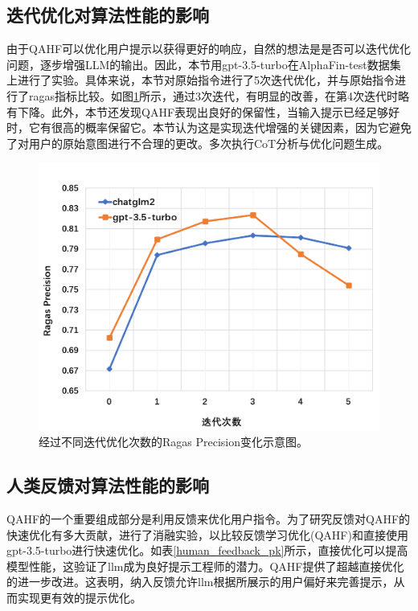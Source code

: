 \subsection{迭代优化对算法性能的影响}

由于QAHF可以优化用户提示以获得更好的响应，自然的想法是是否可以迭代优化问题，逐步增强LLM的输出。因此，本节用gpt-3.5-turbo在AlphaFin-test数据集上进行了实验。具体来说，本节对原始指令进行了5次迭代优化，并与原始指令进行了ragas指标比较。如图\ref{multi_iter_optimize_ragas_exp}所示，通过3次迭代，有明显的改善，在第4次迭代时略有下降。此外，本节还发现QAHF表现出良好的保留性，当输入提示已经足够好时，它有很高的概率保留它。本节认为这是实现迭代增强的关键因素，因为它避免了对用户的原始意图进行不合理的更改。多次执行CoT分析与优化问题生成。

\begin{figure}[htbp]
	\centering
	\includegraphics[scale=0.5]{Fig/multi_iter_optimize_ragas_exp.png}
	\caption{\label{multi_iter_optimize_ragas_exp}经过不同迭代优化次数的Ragas Precision变化示意图。}
\end{figure}

\subsection{人类反馈对算法性能的影响}

QAHF的一个重要组成部分是利用反馈来优化用户指令。为了研究反馈对QAHF的快速优化有多大贡献，进行了消融实验，以比较反馈学习优化(QAHF)和直接使用gpt-3.5-turbo进行快速优化。如表\ref{human_feedback_pk}所示，直接优化可以提高模型性能，这验证了llm成为良好提示工程师的潜力。QAHF提供了超越直接优化的进一步改进。这表明，纳入反馈允许llm根据所展示的用户偏好来完善提示，从而实现更有效的提示优化。

